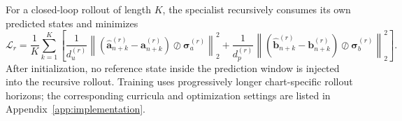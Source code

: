 For a closed-loop rollout of length $K$, the specialist recursively
consumes its own predicted states and minimizes
\begin{equation}
  \mathcal L_r
  =
  \frac{1}{K}
  \sum_{k=1}^{K}
  \left[
    \frac{1}{d_u^{(r)}}
    \left\|
      \left(
        \widehat{\bm a}_{n+k}^{(r)}
        -
        \bm a_{n+k}^{(r)}
      \right)
      \oslash
      \bm\sigma_a^{(r)}
    \right\|_2^2
    +
    \frac{1}{d_p^{(r)}}
    \left\|
      \left(
        \widehat{\bm b}_{n+k}^{(r)}
        -
        \bm b_{n+k}^{(r)}
      \right)
      \oslash
      \bm\sigma_b^{(r)}
    \right\|_2^2
  \right].
  \label{eq:app_true_rollout_loss}
\end{equation}
After initialization, no reference state inside the prediction window is
injected into the recursive rollout. Training uses progressively longer
chart-specific rollout horizons; the corresponding curricula and
optimization settings are listed in Appendix~\ref{app:implementation}.

